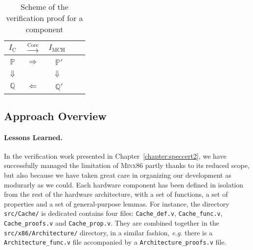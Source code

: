 \begin{table}
  \center
  \begin{tabular}{ccccc}
    $I_{\mathrm{C}}$
    & $\xrightarrow{\mathrm{Core}}$
    & $I_{\mathrm{MCH}}$ \\
    \hline
    \hline
    $\mathbb{P}$
    & $\Longrightarrow$
    & \ $\mathbb{P}'$ \\
    $\Downarrow$
    &
    &
      $\Downarrow$ \\
    $\mathbb{Q}$
    & $\Longleftarrow$
    & \ $\mathbb{Q}'$ \\
    \hline
  \end{tabular}
  \caption{Scheme of the verification proof for a component}
\end{table}

\subsection{Approach Overview}
\label{subsec:freespec:approachoverview}

\paragraph{Lessons Learned.}
%
In the verification work presented in Chapter~\ref{chapter:speccert2}, we have
successfully managed the limitation of {\scshape Minx86} partly thanks to its
reduced scope, but also because we have taken great care in organizing our
development as modurarly as we could.
%
Each hardware component has been defined in isolation from the rest of the
hardware architecture, with a set of functions, a set of properties and a set of
general-purpose lemmas.
%
For instance, the directory \texttt{src/Cache/} is dedicated contains four
files: \texttt{Cache\_def.v}, \texttt{Cache\_func.v}, \texttt{Cache\_proofs.v}
and \texttt{Cache\_prop.v}.
%
They are combined together in the \texttt{src/x86/Architecture/} directory, in a
similar fashion, \emph{e.g.} there is a \texttt{Architecture\_func.v} file
accompanied by a \texttt{Architecture\_proofs.v} file.

